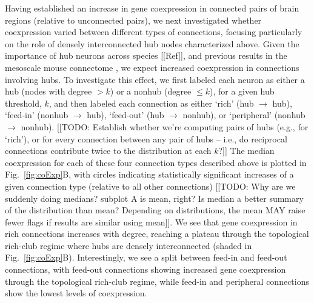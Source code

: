 \documentclass[10pt,letterpaper]{article}
\begin{document}
Having established an increase in gene coexpression in connected pairs of brain regions (relative to unconnected pairs), we next investigated whether coexpression varied between different types of connections, focusing particularly on the role of densely interconnected hub nodes characterized above.
Given the importance of hub neurons across species [[Ref]], and previous results in the mesoscale mouse connectome \cite{Fulcher:2016ck}, we expect increased coexpression in connections involving hubs.
To investigate this effect, we first labeled each neuron as either a hub (nodes with degree $> k$) or a nonhub (degree $\leq k$), for a given hub threshold, $k$, and then labeled each connection as either `rich' (hub $\rightarrow$ hub), `feed-in' (nonhub $\rightarrow$ hub), `feed-out' (hub $\rightarrow$ nonhub), or `peripheral' (nonhub $\rightarrow$ nonhub).
[[TODO: Establish whether we're computing pairs of hubs (e.g., for `rich'), or for every connection between any pair of hubs -- i.e., do reciprocal connections contribute twice to the distribution at each $k$?]]
The median coexpression for each of these four connection types described above is plotted in Fig.~\ref{fig:coExp}B, with circles indicating statistically significant increases of a given connection type (relative to all other connections) [[TODO: Why are we suddenly doing medians? subplot A is mean, right? Is median a better summary of the distribution than mean? Depending on distributions, the mean MAY raise fewer flags if results are similar using mean]].
We see that gene coexpression in rich connections increases with degree, reaching a plateau through the topological rich-club regime where hubs are densely interconnected (shaded in Fig.~\ref{fig:coExp}B).
Interestingly, we see a split between feed-in and feed-out connections, with feed-out connections showing increased gene coexpression through the topological rich-club regime, while feed-in and peripheral connections show the lowest levels of coexpression.
\end{document}
